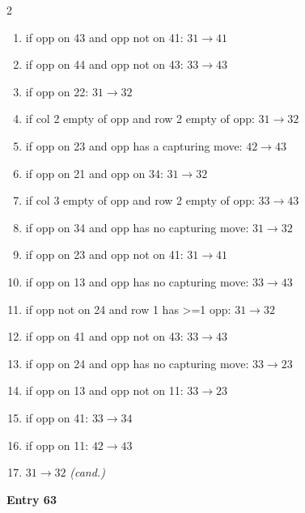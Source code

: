\begin{multicols}{2}
\begin{tikzpicture}[scale=0.24]
\end{tikzpicture}
\nopagebreak\begin{enumerate}[topsep=1pt,itemsep=0pt,parsep=0pt,leftmargin=2.2em,label=\arabic*.]
\item if opp on 43 and opp not on 41: $31\!\to\!41$
\item if opp on 44 and opp not on 43: $33\!\to\!43$
\item if opp on 22: $31\!\to\!32$
\item if col 2 empty of opp and row 2 empty of opp: $31\!\to\!32$
\item if opp on 23 and opp has a capturing move: $42\!\to\!43$
\item if opp on 21 and opp on 34: $31\!\to\!32$
\item if col 3 empty of opp and row 2 empty of opp: $33\!\to\!43$
\item if opp on 34 and opp has no capturing move: $31\!\to\!32$
\item if opp on 23 and opp not on 41: $31\!\to\!41$
\item if opp on 13 and opp has no capturing move: $33\!\to\!43$
\item if opp not on 24 and row 1 has >=1 opp: $31\!\to\!32$
\item if opp on 41 and opp not on 43: $33\!\to\!43$
\item if opp on 24 and opp has no capturing move: $33\!\to\!23$
\item if opp on 13 and opp not on 11: $33\!\to\!23$
\item if opp on 41: $33\!\to\!34$
\item if opp on 11: $42\!\to\!43$
\item $31\!\to\!32$ \hfill\textit{(cand.)}
\end{enumerate}\smallskip
\noindent\textbf{Entry 63} \; 
\end{multicols}
